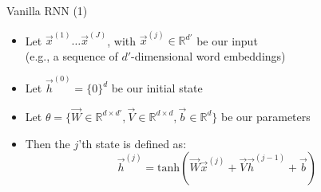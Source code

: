 
\begin{vbframe}{Vanilla RNN (1)}

\vfill

\begin{itemize}
	\item Let $\vec x^{(1)} \ldots \vec x^{(J)}$, with $\vec x^{(j)} \in \mathbb{R}^{d'}$ be our input\\
				(e.g., a sequence of $d'$-dimensional word embeddings)
	\item Let $\vec h^{(0)}  = \{0\}^{d}$ be our initial state
	\item Let $\theta = \{\vec W \in \mathbb{R}^{d \times d'}, \vec V \in \mathbb{R}^{d \times d}, \vec b \in \mathbb{R}^{d}\}$ be our parameters
	\item Then the $j$'th state is defined as:
	$$\vec h^{(j)} = \mathrm{tanh}(\vec W \vec x^{(j)}  + \vec V \vec h^{({j-1})} + \vec b)$$
\end{itemize}

\vfill

\end{vbframe}


